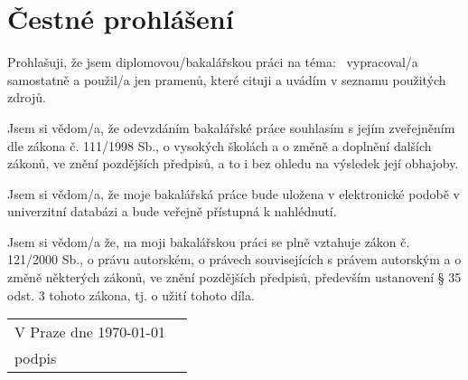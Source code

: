 \vspace*{\fill}
\section*{Čestné prohlášení}
Prohlašuji, že jsem diplomovou/bakalářskou práci na téma: \doctitle \ vypracoval/a samostatně a použil/a jen pramenů, které cituji a uvádím v seznamu použitých zdrojů.

Jsem si vědom/a, že odevzdáním bakalářské práce souhlasím s jejím zveřejněním dle zákona č. 111/1998 Sb., o vysokých školách a o změně a doplnění dalších zákonů, ve znění pozdějších předpisů, a to i bez ohledu na výsledek její obhajoby.

Jsem si vědom/a, že moje bakalářská práce bude uložena v elektronické podobě v univerzitní databázi a bude veřejně přístupná k nahlédnutí.

Jsem si vědom/a že, na moji bakalářskou práci se plně vztahuje zákon č. 121/2000 Sb., o právu autorském, o právech souvisejících s právem autorským a o změně některých zákonů, ve znění pozdějších předpisů, především ustanovení § 35 odst. 3 tohoto zákona, tj. o užití tohoto díla.

\qquad

\setlength{\dashlinedash}{1pt}
\setlength{\dashlinegap}{1pt}
\setlength{\arrayrulewidth}{1pt}

\noindent
\begin{tabularx}{\textwidth}{X r}
V Praze dne \today &
\begin{tabular}[b]{@{} p{6cm} @{}}
\\
\hdashline
\centering
podpis
\end{tabular}
\\
\end{tabularx}
